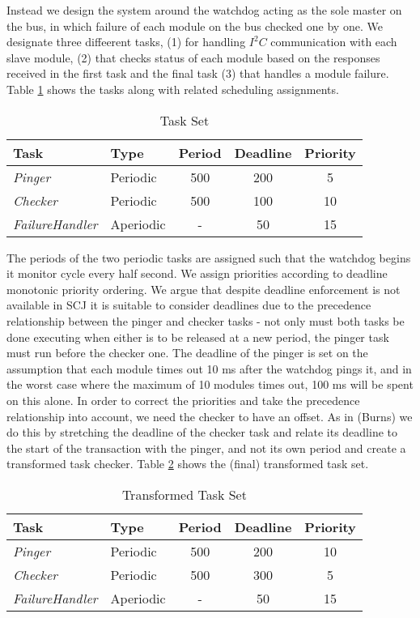 Instead we design the system around the watchdog acting as the sole master on the bus, in which failure of each module on the bus checked one by one. We designate three diffeerent tasks, (1) for handling $\textit{I}^2\textit{C}$ communication with each slave module, (2) that checks status of each module based on the responses received in the first task and the final task (3) that handles a module failure. Table \ref{tab:tasks} shows the tasks along with related scheduling assignments.
\begin{center}
	\begin{table}
    \begin{tabular}{ | l | l | c | c | c |}
    \hline
    Task & Type & Period & Deadline & Priority  \\ \hline
    \textit{Pinger} & Periodic & 500 & 200 & 5  \\ \hline
    \textit{Checker} & Periodic & 500 & 100 & 10 \\ \hline
    \textit{FailureHandler} & Aperiodic & - & 50 & 15 \\
    \hline
    \end{tabular}
    \label{tab:tasks}
     \caption{Task Set}
    \end{table}
\end{center}

The periods of the two periodic tasks are assigned such that the watchdog begins it monitor cycle every half second. We assign priorities according to deadline monotonic priority ordering. We argue that despite deadline enforcement is not available in SCJ it is suitable to consider deadlines due to the precedence relationship between the pinger and checker tasks - not only must both tasks be done executing when either is to be released at a new period, the pinger task must run before the checker one. The deadline of the pinger is set on the assumption that each module times out 10 ms after the watchdog pings it, and in the worst case where the maximum of 10 modules times out, 100 ms will be spent on this alone. In order to correct the priorities and take the precedence relationship into account, we need the checker to have an offset. As in (Burns) we do this by stretching the deadline of the checker task and relate its deadline to the start of the transaction with the pinger, and not its own period and create a transformed task checker. Table \ref{tab:tasks2} shows the (final) transformed task set.
\begin{center}
	\begin{table}
    \begin{tabular}{ | l | l | c | c | c |}
    \hline
    Task & Type & Period & Deadline & Priority  \\ \hline
    \textit{Pinger} & Periodic & 500 & 200 & 10  \\ \hline
    \textit{Checker} & Periodic & 500 & 300 & 5 \\ \hline
    \textit{FailureHandler} & Aperiodic & - & 50 & 15 \\
    \hline
    \end{tabular}
    \label{tab:tasks2}
     \caption{Transformed Task Set}
    \end{table}
\end{center}

